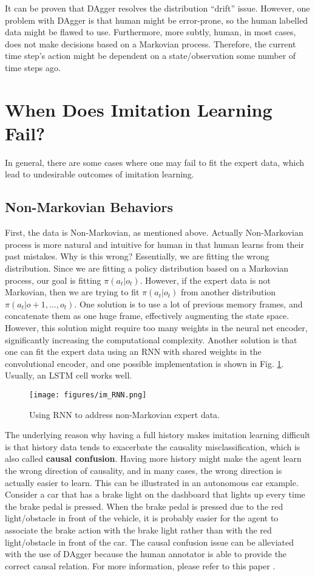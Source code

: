 It can be proven that DAgger resolves the distribution ``drift'' issue. However, one problem with DAgger is that human might be error-prone, so the human labelled data might be flawed to use. Furthermore, more subtly, human, in most cases, does not make decisions based on a Markovian process. Therefore, the current time step's action might be dependent on a state/observation some number of time steps ago.
\section{When Does Imitation Learning Fail?}
In general, there are some cases where one may fail to fit the expert data, which lead to undesirable outcomes of imitation learning.
\subsection{Non-Markovian Behaviors}
First, the data is Non-Markovian, as mentioned above. Actually Non-Markovian process is more natural and intuitive for human in that human learns from their past mistakes. Why is this wrong? Essentially, we are fitting the wrong distribution. Since we are fitting a policy distribution based on a Markovian process, our goal is fitting $\pi(a_t|o_t)$. However, if the expert data is not Markovian, then we are trying to fit $\pi(a_t|o_t)$ from another distribution $\pi(a_t|o+1,...,o_t)$. One solution is to use a lot of previous memory frames, and concatenate them as one huge frame, effectively augmenting the state space. However, this solution might require too many weights in the neural net encoder, significantly increasing the computational complexity. Another solution is that one can fit the expert data using an RNN with shared weights in the convolutional encoder, and one possible implementation is shown in Fig. \ref{fig:im_RNN}. Usually, an LSTM cell works well.
\begin{figure}
    \centering
    \texttt{[image: figures/im\_RNN.png]}
    \caption{Using RNN to address non-Markovian expert data.}
    \label{fig:im_RNN}
\end{figure}


The underlying reason why having a full history makes imitation learning difficult is that history data tends to exacerbate the causality misclassification, which is also called \textbf{causal confusion}. Having more history might make the agent learn the wrong direction of causality, and in many cases, the wrong direction is actually easier to learn. This can be illustrated in an autonomous car example. Consider a car that has a brake light on the dashboard that lights up every time the brake pedal is pressed. When the brake pedal is pressed due to the red light/obstacle in front of the vehicle, it is probably easier for the agent to associate the brake action with the brake light rather than with the red light/obstacle in front of the car. The causal confusion issue can be alleviated with the use of DAgger because the human annotator is able to provide the correct causal relation. For more information, please refer to this paper \cite{de2019causal}.
